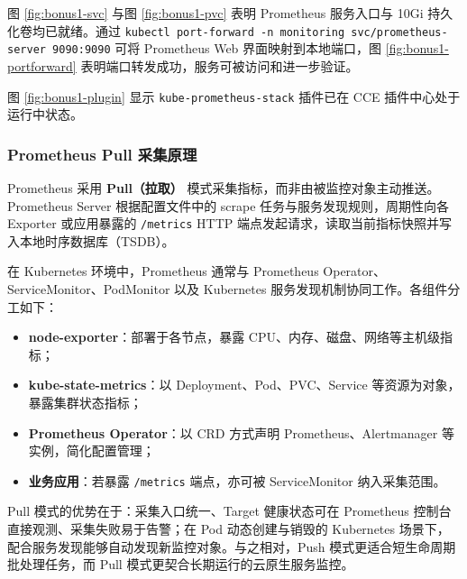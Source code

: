 
图 \ref{fig:bonus1-svc} 与图 \ref{fig:bonus1-pvc} 表明 Prometheus 服务入口与 10Gi 持久化卷均已就绪。通过 \verb|kubectl port-forward -n monitoring svc/prometheus-server 9090:9090| 可将 Prometheus Web 界面映射到本地端口，图 \ref{fig:bonus1-portforward} 表明端口转发成功，服务可被访问和进一步验证。



图 \ref{fig:bonus1-plugin} 显示 \verb|kube-prometheus-stack| 插件已在 CCE 插件中心处于运行中状态。

\subsubsection{Prometheus Pull 采集原理}

Prometheus 采用 \textbf{Pull（拉取）} 模式采集指标，而非由被监控对象主动推送。Prometheus Server 根据配置文件中的 scrape 任务与服务发现规则，周期性向各 Exporter 或应用暴露的 \verb|/metrics| HTTP 端点发起请求，读取当前指标快照并写入本地时序数据库（TSDB）。

在 Kubernetes 环境中，Prometheus 通常与 Prometheus Operator、ServiceMonitor、PodMonitor 以及 Kubernetes 服务发现机制协同工作。各组件分工如下：

\begin{itemize}
  \item \textbf{node-exporter}：部署于各节点，暴露 CPU、内存、磁盘、网络等主机级指标；
  \item \textbf{kube-state-metrics}：以 Deployment、Pod、PVC、Service 等资源为对象，暴露集群状态指标；
  \item \textbf{Prometheus Operator}：以 CRD 方式声明 Prometheus、Alertmanager 等实例，简化配置管理；
  \item \textbf{业务应用}：若暴露 \verb|/metrics| 端点，亦可被 ServiceMonitor 纳入采集范围。
\end{itemize}

Pull 模式的优势在于：采集入口统一、Target 健康状态可在 Prometheus 控制台直接观测、采集失败易于告警；在 Pod 动态创建与销毁的 Kubernetes 场景下，配合服务发现能够自动发现新监控对象。与之相对，Push 模式更适合短生命周期批处理任务，而 Pull 模式更契合长期运行的云原生服务监控。

